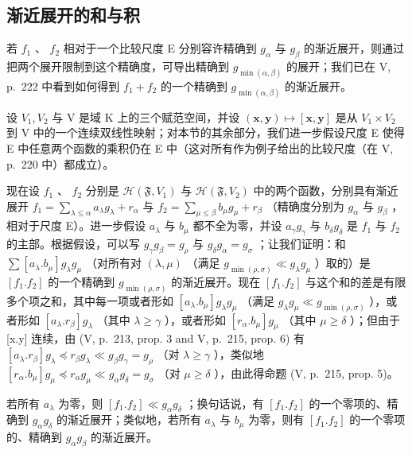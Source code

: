 \subsection{渐近展开的和与积}

若 \(f_{1}\) 、 \(f_{2}\) 相对于一个比较尺度 E 分别容许精确到 \(g_{\alpha}\) 与 \(g_{\beta}\) 的渐近展开，则通过把两个展开限制到这个精确度，可导出精确到 \(g_{\min(\alpha,\beta)}\) 的展开；我们已在 V, p.~222 中看到如何得到 \(f_{1} + f_{2}\) 的一个精确到 \(g_{\min(\alpha,\beta)}\) 的渐近展开。

设 \(V_{1}, V_{2}\) 与 V 是域 K 上的三个赋范空间，并设 \((\mathbf{x}, \mathbf{y}) \mapsto [\mathbf{x}, \mathbf{y}]\) 是从 \(V_{1} \times V_{2}\) 到 V 中的一个连续双线性映射；对本节的其余部分，我们进一步假设尺度 E 使得 E 中任意两个函数的乘积仍在 E 中（这对所有作为例子给出的比较尺度（在 V, p.~220 中）都成立）。

现在设 \(f_{1}\) 、 \(f_{2}\) 分别是 \(\mathcal{H}(\mathfrak{F}, V_{1})\) 与 \(\mathcal{H}(\mathfrak{F}, V_{2})\) 中的两个函数，分别具有渐近展开 \(f_{1} = \sum_{\lambda \leqslant \alpha} a_{\lambda} g_{\lambda} + r_{\alpha}\) 与 \(f_{2} = \sum_{\mu \leqslant \beta} b_{\mu} g_{\mu} + r_{\beta}\) （精确度分别为 \(g_{\alpha}\) 与 \(g_{\beta}\) ，相对于尺度 E）。进一步假设 \(a_{\lambda}\) 与 \(b_{\mu}\) 都不全为零，并设 \(a_{\gamma} g_{\gamma}\) 与 \(b_{\delta} g_{\delta}\) 是 \(f_{1}\) 与 \(f_{2}\) 的主部。根据假设，可以写 \(g_{\gamma} g_{\beta} = g_{\rho}\) 与 \(g_{\delta} g_{\alpha} = g_{\sigma}\) ；让我们证明：和 \(\sum[a_{\lambda}.b_{\mu}]g_{\lambda}g_{\mu}\) （对所有对 \((\lambda,\mu)\) （满足 \(g_{\min(\rho,\sigma)}\ll g_{\lambda}g_{\mu}\) ）取的）是 \([f_{1}.f_{2}]\) 的一个精确到 \(g_{\min(\rho,\sigma)}\) 的渐近展开。现在 \([f_{1}.f_{2}]\) 与这个和的差是有限多个项之和，其中每一项或者形如 \([a_{\lambda}.b_{\mu}]g_{\lambda}g_{\mu}\) （满足 \(g_{\lambda}g_{\mu}\ll g_{\min(\rho,\sigma)}\) ），或者形如 \([a_{\lambda}.r_{\beta}]g_{\lambda}\) （其中 \(\lambda\geqslant\gamma\) ），或者形如 \([r_{\alpha}.b_{\mu}]g_{\mu}\) （其中 \(\mu\geqslant\delta\) ）；但由于 {[}x.y{]} 连续，由 (V, p.~213, prop. 3 and V, p.~215, prop. 6) 有 \([a_{\lambda}.r_{\beta}]g_{\lambda}\preccurlyeq r_{\beta}g_{\lambda}\ll g_{\beta}g_{\gamma}=g_{\rho}\) （对 \(\lambda\geqslant\gamma\) ），类似地 \([r_{\alpha}.b_{\mu}]g_{\mu}\preccurlyeq r_{\alpha}g_{\mu}\ll g_{\alpha}g_{\delta}=g_{\sigma}\) （对 \(\mu\geqslant\delta\) ），由此得命题 (V, p.~215, prop. 5)。

若所有 \(a_{\lambda}\) 为零，则 \([f_{1}.f_{2}] \ll g_{\alpha}g_{\delta}\) ；换句话说，有 \([f_{1}.f_{2}]\) 的一个零项的、精确到 \(g_{\alpha}g_{\delta}\) 的渐近展开；类似地，若所有 \(a_{\lambda}\) 与 \(b_{\mu}\) 为零，则有 \([f_{1}.f_{2}]\) 的一个零项的、精确到 \(g_{\alpha}g_{\beta}\) 的渐近展开。


